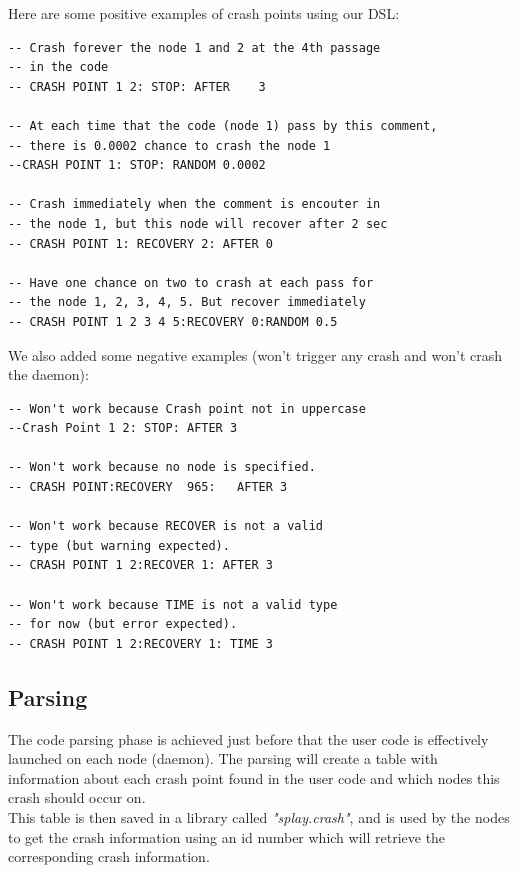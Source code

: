 \documentclass{eplmastersthesis}
\begin{document}
        Here are some positive examples of crash points using our DSL:

        \begin{lstlisting}[style=MyLua]
-- Crash forever the node 1 and 2 at the 4th passage
-- in the code
-- CRASH POINT 1 2: STOP: AFTER    3

-- At each time that the code (node 1) pass by this comment,
-- there is 0.0002 chance to crash the node 1
--CRASH POINT 1: STOP: RANDOM 0.0002

-- Crash immediately when the comment is encouter in
-- the node 1, but this node will recover after 2 sec
-- CRASH POINT 1: RECOVERY 2: AFTER 0

-- Have one chance on two to crash at each pass for
-- the node 1, 2, 3, 4, 5. But recover immediately
-- CRASH POINT 1 2 3 4 5:RECOVERY 0:RANDOM 0.5
          \end{lstlisting}

        We also added some negative examples (won't trigger any crash
        and won't crash the daemon):

        \begin{lstlisting}[style=MyLua]
-- Won't work because Crash point not in uppercase
--Crash Point 1 2: STOP: AFTER 3

-- Won't work because no node is specified.
-- CRASH POINT:RECOVERY  965:   AFTER 3

-- Won't work because RECOVER is not a valid
-- type (but warning expected).
-- CRASH POINT 1 2:RECOVER 1: AFTER 3

-- Won't work because TIME is not a valid type
-- for now (but error expected).
-- CRASH POINT 1 2:RECOVERY 1: TIME 3
        \end{lstlisting}

      \subsection{Parsing}

        The code parsing phase is achieved just before that the user code
        is effectively launched on each node (daemon). The parsing will
        create a table with information about each crash point found in the
        user code and which nodes this crash should occur on.\\
        This table is then saved in a library called \textit{"splay.crash"},
        and is used by the nodes to get the crash information using an id
        number which will retrieve the corresponding crash information.\\
\end{document}
